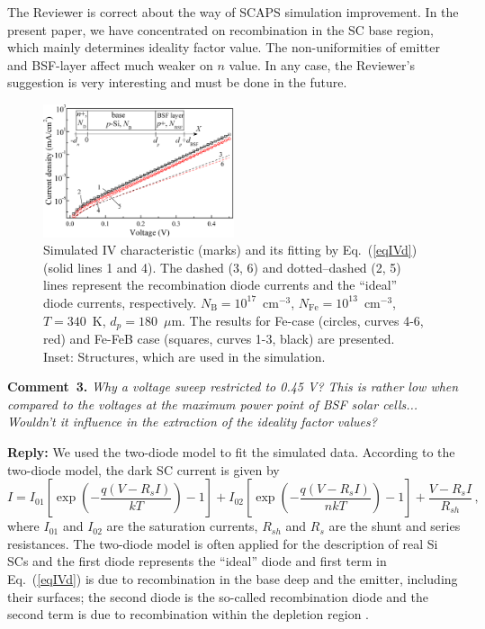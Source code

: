 \documentclass[num-refs]{wiley-article} %
\begin{document}
The Reviewer is correct about the way of SCAPS simulation improvement.
In the present paper, we have concentrated on recombination in the SC base region,
which mainly determines ideality factor value.
The non-uniformities of emitter and  BSF-layer affect much weaker on $n$ value.
In any case, the Reviewer’s suggestion is very interesting and must be done in the
future.

\begin{figure}[t]
\centering
\includegraphics[width=0.5\textwidth]{FigIV}
\caption{Simulated IV characteristic (marks)
and its fitting by Eq.~(\ref{eqIVd}) (solid lines 1 and 4).
The dashed (3, 6) and dotted--dashed (2, 5)
lines represent the recombination diode currents and the ``ideal'' diode currents, respectively.
$N_\mathrm{B} = 10^{17}$~cm$^{-3}$, $N_\mathrm{Fe} = 10^{13}$~cm$^{-3}$,
$T = 340$~K, $d_p = 180$~$\mu$m.
The results for Fe-case (circles, curves 4-6, red)
and Fe-FeB case (squares, curves 1-3, black) are presented.
Inset: Structures, which are used in the simulation.
}
\label{fig_IV}
\end{figure}


\vspace{1cm}
\noindent
\textcolor[rgb]{0.00,0.50,1.00}{\textbf{Comment~3.}}
\emph{Why a voltage sweep restricted to 0.45 V?
This is rather low when compared to the voltages at the maximum power point of BSF solar cells...
Wouldn't it influence in the extraction of the ideality factor values?}

\vspace{0.5cm}
\noindent
\textcolor[rgb]{0.51,0.00,0.00}{\textbf{Reply:}}
We used the two-diode model to fit the simulated data.
According to the two-diode model, the dark SC current is given by
\begin{equation}
\label{eqIVd}
    I=I_{01}\left[\exp\left(-\frac{q(V-R_sI)}{kT}\right)-1\right]
      + I_{02}\left[\exp\left(-\frac{q(V-R_sI)}{nkT}\right)-1\right]
      +\frac{V-R_sI}{R_{sh}}\,,
\end{equation}
where
$I_{01}$ and $I_{02}$ are the saturation currents,
$R_{sh}$ and $R_s$ are the shunt and series resistances.
The two-diode model is often applied for the description of real Si SCs
and the first diode represents the ``ideal'' diode and
first term in Eq.~(\ref{eqIVd})
is due to recombination in the base deep
and the emitter, including their surfaces;
the second diode is the so-called recombination diode
and the second term is due to recombination within
the depletion region \citep{Breitenstein2013}.
\end{document}
